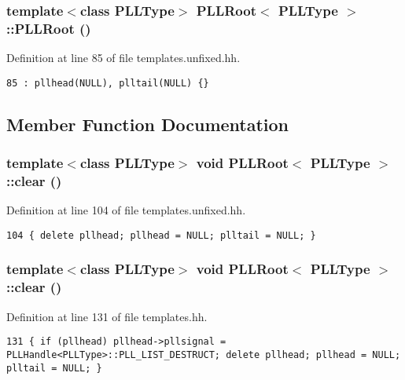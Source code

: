 \subsubsection{\setlength{\rightskip}{0pt plus 5cm}template$<$class PLLType$>$ PLLRoot$<$ {\bf PLLType} $>$::PLLRoot ()\hspace{0.3cm}{\tt  [inline]}}\label{classPLLRoot_a52}




Definition at line 85 of file templates.unfixed.hh.



\footnotesize\begin{verbatim}85 : pllhead(NULL), plltail(NULL) {} 
\end{verbatim}\normalsize 


\subsection{Member Function Documentation}
\subsubsection{\setlength{\rightskip}{0pt plus 5cm}template$<$class PLLType$>$ void PLLRoot$<$ {\bf PLLType} $>$::clear ()\hspace{0.3cm}{\tt  [inline]}}\label{classPLLRoot_a67}




Definition at line 104 of file templates.unfixed.hh.



\footnotesize\begin{verbatim}104 { delete pllhead; pllhead = NULL; plltail = NULL; }
\end{verbatim}\normalsize 
{}
\subsubsection{\setlength{\rightskip}{0pt plus 5cm}template$<$class PLLType$>$ void PLLRoot$<$ {\bf PLLType} $>$::clear ()\hspace{0.3cm}{\tt  [inline]}}\label{classPLLRoot_a50}




Definition at line 131 of file templates.hh.



\footnotesize\begin{verbatim}131 { if (pllhead) pllhead->pllsignal = PLLHandle<PLLType>::PLL_LIST_DESTRUCT; delete pllhead; pllhead = NULL; plltail = NULL; }
\end{verbatim}\normalsize 
{}
